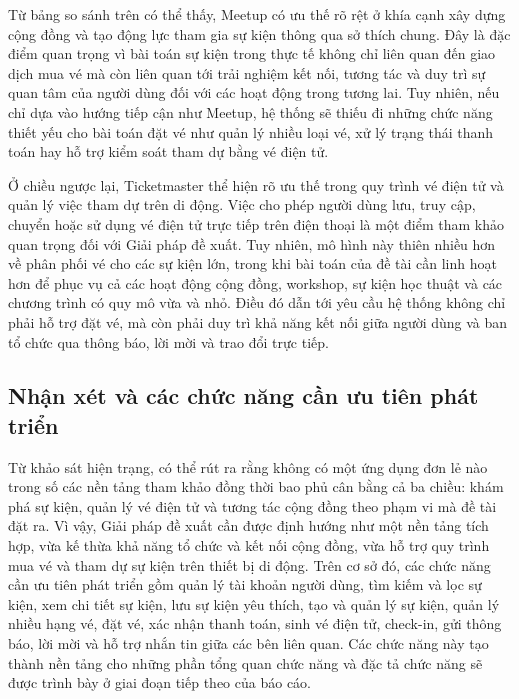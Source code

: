 \documentclass[../DoAn.tex]{subfiles}
\begin{document}
Từ bảng so sánh trên có thể thấy, Meetup có ưu thế rõ rệt ở khía cạnh xây dựng cộng đồng và tạo động lực tham gia sự kiện thông qua sở thích chung. Đây là đặc điểm quan trọng vì bài toán sự kiện trong thực tế không chỉ liên quan đến giao dịch mua vé mà còn liên quan tới trải nghiệm kết nối, tương tác và duy trì sự quan tâm của người dùng đối với các hoạt động trong tương lai. Tuy nhiên, nếu chỉ dựa vào hướng tiếp cận như Meetup, hệ thống sẽ thiếu đi những chức năng thiết yếu cho bài toán đặt vé như quản lý nhiều loại vé, xử lý trạng thái thanh toán hay hỗ trợ kiểm soát tham dự bằng vé điện tử.

Ở chiều ngược lại, Ticketmaster thể hiện rõ ưu thế trong quy trình vé điện tử và quản lý việc tham dự trên di động. Việc cho phép người dùng lưu, truy cập, chuyển hoặc sử dụng vé điện tử trực tiếp trên điện thoại là một điểm tham khảo quan trọng đối với Giải pháp đề xuất. Tuy nhiên, mô hình này thiên nhiều hơn về phân phối vé cho các sự kiện lớn, trong khi bài toán của đề tài cần linh hoạt hơn để phục vụ cả các hoạt động cộng đồng, workshop, sự kiện học thuật và các chương trình có quy mô vừa và nhỏ. Điều đó dẫn tới yêu cầu hệ thống không chỉ phải hỗ trợ đặt vé, mà còn phải duy trì khả năng kết nối giữa người dùng và ban tổ chức qua thông báo, lời mời và trao đổi trực tiếp.

\subsection{Nhận xét và các chức năng cần ưu tiên phát triển}
Từ khảo sát hiện trạng, có thể rút ra rằng không có một ứng dụng đơn lẻ nào trong số các nền tảng tham khảo đồng thời bao phủ cân bằng cả ba chiều: khám phá sự kiện, quản lý vé điện tử và tương tác cộng đồng theo phạm vi mà đề tài đặt ra. Vì vậy, Giải pháp đề xuất cần được định hướng như một nền tảng tích hợp, vừa kế thừa khả năng tổ chức và kết nối cộng đồng, vừa hỗ trợ quy trình mua vé và tham dự sự kiện trên thiết bị di động. Trên cơ sở đó, các chức năng cần ưu tiên phát triển gồm quản lý tài khoản người dùng, tìm kiếm và lọc sự kiện, xem chi tiết sự kiện, lưu sự kiện yêu thích, tạo và quản lý sự kiện, quản lý nhiều hạng vé, đặt vé, xác nhận thanh toán, sinh vé điện tử, check-in, gửi thông báo, lời mời và hỗ trợ nhắn tin giữa các bên liên quan. Các chức năng này tạo thành nền tảng cho những phần tổng quan chức năng và đặc tả chức năng sẽ được trình bày ở giai đoạn tiếp theo của báo cáo.
\end{document}

